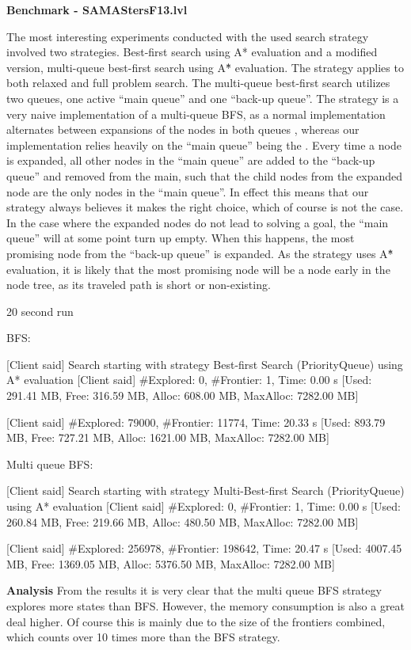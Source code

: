 \textbf{Benchmark - SAMAStersF13.lvl}


The most interesting experiments conducted with the used search strategy involved two strategies. Best-first search using A* evaluation and a modified version, multi-queue best-first search using A\^{*} evaluation. The strategy applies to both relaxed and full problem search. 
The multi-queue best-first search utilizes two queues, one active ``main queue'' and one ``back-up queue''. The strategy is a very naive implementation of a multi-queue BFS, as a normal implementation alternates between expansions of the nodes in both queues \cite{hector2013a}, whereas our implementation relies heavily on the ``main queue'' being the . Every time a node is expanded, all other nodes in the ``main queue'' are added to the ``back-up queue'' and removed from the main, such that the child nodes from the expanded node are the only nodes in the ``main queue''. In effect this means that our strategy always believes it makes the right choice, which of course is not the case. In the case where the expanded nodes do not lead to solving a goal, the ``main queue'' will at some point turn up empty. When this happens, the most promising node from the ``back-up queue'' is expanded. As the strategy uses A\^{*} evaluation, it is likely that the most promising node will be a node early in the node tree, as its traveled path is short or non-existing. 



20 second run 

BFS:

[Client said] Search starting with strategy Best-first Search (PriorityQueue) using A* evaluation
[Client said] #Explored:    0, #Frontier:   1, Time: 0.00 s     [Used: 291.41 MB, Free: 316.59 MB, Alloc: 608.00 MB, MaxAlloc: 7282.00 MB]

[Client said] #Explored: 79000, #Frontier: 11774, Time: 20.33 s     [Used: 893.79 MB, Free: 727.21 MB, Alloc: 1621.00 MB, MaxAlloc: 7282.00 MB]


Multi queue BFS:

[Client said] Search starting with strategy Multi-Best-first Search (PriorityQueue) using A* evaluation
[Client said] #Explored:    0, #Frontier:   1, Time: 0.00 s     [Used: 260.84 MB, Free: 219.66 MB, Alloc: 480.50 MB, MaxAlloc: 7282.00 MB]

[Client said] #Explored: 256978, #Frontier: 198642, Time: 20.47 s   [Used: 4007.45 MB, Free: 1369.05 MB, Alloc: 5376.50 MB, MaxAlloc: 7282.00 MB]


\textbf{Analysis}
From the results it is very clear that the multi queue BFS strategy explores more states than BFS. However, the memory consumption is also a great deal higher. Of course this is mainly due to the size of the frontiers combined, which counts over 10 times more than the BFS strategy. 



